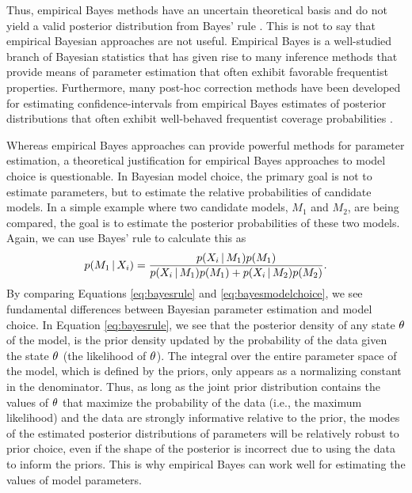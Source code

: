 Thus, empirical Bayes methods have an uncertain theoretical basis and
do not yield a valid posterior distribution from Bayes' rule \citep[e.g.,
empirical Bayesian estimates of the posterior are often too narrow, off-center,
and incorrectly shaped;][]{Morris1983,Laird1987,Carlin1990,Efron2013}.
This is not to say that empirical Bayesian approaches are not useful.
Empirical Bayes is a well-studied branch of Bayesian statistics that has given
rise to many inference methods that provide means of
parameter estimation that often exhibit favorable frequentist properties.
Furthermore, many post-hoc correction methods have been developed for
estimating confidence-intervals from empirical Bayes estimates of posterior
distributions that often exhibit well-behaved frequentist coverage
probabilities
\citep{Morris1983,Laird1987,Laird1989, Carlin1990,Hwang2009}.

Whereas empirical Bayes approaches can provide powerful methods for parameter
estimation, a theoretical justification for empirical Bayes approaches to model
choice is questionable.
In Bayesian model choice, the primary goal is not to estimate parameters, but
to estimate the relative probabilities of candidate models.
In a simple example where two candidate models, $M_1$ and $M_2$, are being
compared, the goal is to estimate the posterior probabilities of these two
models.
Again, we can use Bayes' rule to calculate this as
\begin{equation}
    p(M_1 \given \alignment{i}{}) = \frac{p(\alignment{i}{} \given
    M_1)p(M_1)}{p(\alignment{i}{} \given M_1)p(M_1) + p(\alignment{i}{} \given
    M_2)p(M_2)}.
    \label{eq:bayesmodelchoice}
\end{equation}
By comparing Equations \ref{eq:bayesrule} and \ref{eq:bayesmodelchoice}, we
see fundamental differences between Bayesian parameter estimation and
model choice.
In Equation \ref{eq:bayesrule}, we see that the posterior density of any
state $\theta_{}$ of the model, is the prior density updated by the
probability of the data given the state $\theta_{}$ (the likelihood of
$\theta_{}$).
The integral over the entire parameter space of the model, which is defined by
the priors, only appears as a normalizing constant in the denominator.
Thus, as long as the joint prior distribution contains the values of
$\theta_{}$ that maximize the probability of the data (i.e., the maximum
likelihood) and the data are strongly informative relative to the prior, the
modes of the estimated posterior distributions of parameters will be relatively
robust to prior choice, even if the shape of the posterior is incorrect due to
using the data to inform the priors.
This is why empirical Bayes can work well for estimating the values of model
parameters.

